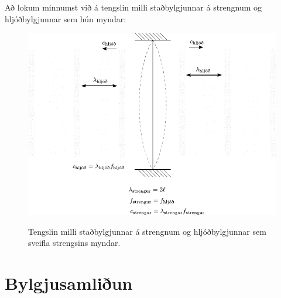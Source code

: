 Að lokum minnumst við á tengslin milli staðbylgjunnar á strengnum og hljóðbylgjunnar sem hún myndar:

\begin{figure}[H]
    \centering
    \includegraphics{figures/hljodbylgja-strengur.pdf}
    \label{fig:my_label}
    \caption{Tengslin milli staðbylgjunnar á strengnum og hljóðbylgjunnar sem sveifla strengsins myndar.}
\end{figure}


\section{Bylgjusamliðun}

